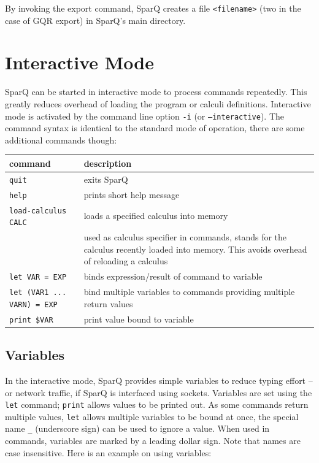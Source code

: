 \documentclass[headsepline]{scrreprt}
\theoremstyle{definition}
\newcommand{\engine}{SparQ}
\begin{document}
By invoking the export command, \engine{} creates a file \verb=<filename>= (two in the case of GQR export) in \engine{}'s main directory.


\section{Interactive Mode}\label{sec:interactive}

\engine{} can be started in interactive mode to process commands repeatedly. This greatly reduces
overhead of loading the program or calculi definitions. Interactive mode is activated by the command line option {\tt -i} (or {\tt --interactive}). The command syntax is identical to the standard mode of operation, there are some additional commands though:\pagebreak[4]

\begin{center}
\begin{longtable}{|lp{9cm}|}\hline
	{\bf command} & {\bf description} \\ \hline \hline
	{\tt quit} & exits \engine{}\\
	{\tt help} & prints short help message\\
	{\tt load-calculus CALC} & loads a specified calculus into memory\\
	{\tt *} & used as calculus specifier in commands, {\tt *} stands for the calculus recently loaded into memory. This avoids overhead of reloading a calculus\\
	{\tt let VAR = EXP} & binds expression/result of command to variable\\
	{\tt let (VAR1 ... VARN) = EXP} & bind multiple variables to commands providing multiple return values\\
	{\tt print \$VAR} & print value bound to variable\\
	 \hline
\end{longtable}
\end{center}

\subsection{Variables}
In the interactive mode, \engine{} provides simple variables to reduce typing effort -- or network traffic, if \engine{} is interfaced using sockets. 
Variables are set using the {\tt let} command; {\tt print} allows values to be printed out. 
As some commands return multiple values, {\tt let} allows multiple variables to be bound at once, the special name \verb=_= (underscore sign) can be used to ignore a value.
When used in commands, variables are marked by a leading dollar sign. Note that names are case insensitive. Here is an example on using variables:
\end{document}
